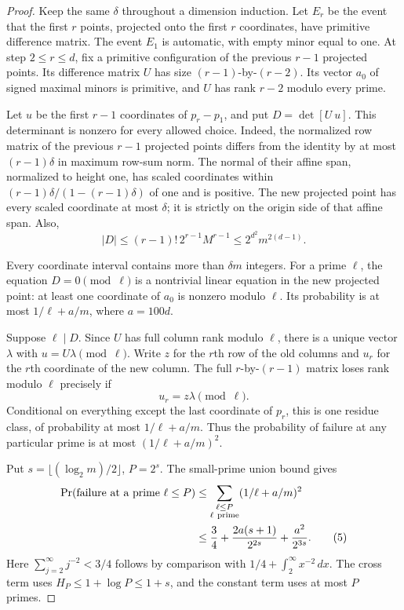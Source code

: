 \documentclass[11pt,a4paper]{article}
\theoremstyle{remark}
\newcommand{\floor}[1]{\lfloor#1\rfloor}
\newcommand{\dd}{\delta}
\begin{document}
\begin{proof}
Keep the same \(\dd\) throughout a dimension induction.
Let \(E_r\) be the event that the first \(r\) points, projected onto the
first \(r\) coordinates, have primitive difference matrix.
The event \(E_1\) is automatic, with empty minor equal to one.
At step \(2\leq r\leq d\), fix a primitive configuration of the previous
\(r-1\) projected points. Its difference matrix \(U\) has size
\((r-1)\)-by-\((r-2)\). Its vector \(a_0\) of signed maximal minors
is primitive, and \(U\) has rank \(r-2\) modulo every prime.

Let \(u\) be the first \(r-1\) coordinates of \(p_r-p_1\), and put
\(D=\det[U\ u]\). This determinant is nonzero for every allowed choice.
Indeed, the normalized row matrix of the previous \(r-1\) projected
points differs from the identity by at most \((r-1)\dd\) in maximum
row-sum norm. The normal of their affine span, normalized to height one,
has scaled coordinates within
\((r-1)\dd/(1-(r-1)\dd)\) of one and is positive.
The new projected point has every scaled coordinate at most \(\dd\);
it is strictly on the origin side of that affine span.
Also,
\[
 |D|\leq (r-1)!\,2^{r-1}M^{r-1}
       \leq2^{d^2}m^{2(d-1)}.                    \tag{3}\label{eq:D}
\]

Every coordinate interval contains more than \(\dd m\) integers.
For a prime \(\ell\), the equation \(D=0\pmod\ell\) is a nontrivial
linear equation in the new projected point: at least one coordinate
of \(a_0\) is nonzero modulo \(\ell\).
Its probability is at most \(1/\ell+a/m\), where \(a=100d\).

Suppose \(\ell\mid D\). Since \(U\) has full column rank modulo
\(\ell\), there is a unique vector \(\lambda\) with
\(u=U\lambda\pmod\ell\). Write \(z\) for the \(r\)th row of the old
columns and \(u_r\) for the \(r\)th coordinate of the new column.
The full \(r\)-by-\((r-1)\) matrix loses rank modulo \(\ell\) precisely if
\[
 u_r=z\lambda\pmod\ell.                         \tag{4}\label{eq:residue}
\]
Conditional on everything except the last coordinate of \(p_r\),
this is one residue class, of probability at most \(1/\ell+a/m\).
Thus the probability of failure at any particular prime is at most
\((1/\ell+a/m)^2\).

Put \(s=\floor{(\log_2 m)/2}\), \(P=2^s\).
The small-prime union bound gives
\begin{align}
 \Pr(\text{failure at a prime }\ell\leq P)
 &\leq\sum_{\substack{\ell\leq P\\\ell\ {\rm prime}}}
                 (1/\ell+a/m)^2 \notag\\
 &\leq\frac34+\frac{2a(s+1)}{2^{2s}}+
                      \frac{a^2}{2^{3s}}.       \tag{5}\label{eq:small}
\end{align}
Here \(\sum_{j=2}^{\infty}j^{-2}<3/4\) follows by comparison with
\(1/4+\int_2^\infty x^{-2}\,dx\).
The cross term uses \(H_P\leq1+\log P\leq1+s\), and the constant
term uses at most \(P\) primes.


\end{proof}
\end{document}
